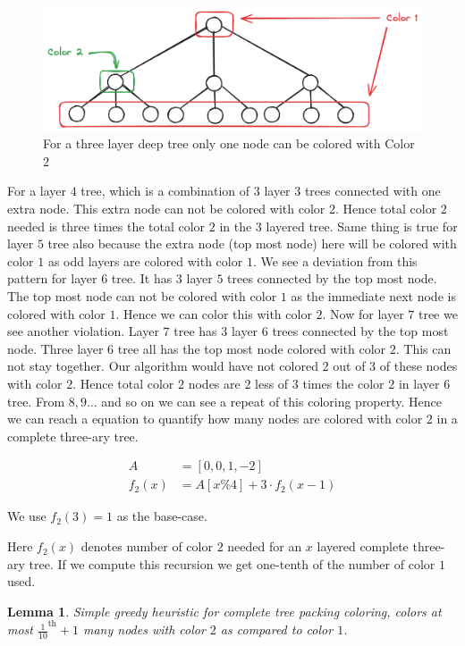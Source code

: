\documentclass{article}
\newtheorem{lemma}[theorem]{Lemma}
\theoremstyle{remark}
\begin{document}
\begin{figure}
    \centering
    \includegraphics[width=0.7\linewidth]{layer 3.png}
    \caption{For a three layer deep tree only one node can be colored with Color $2$}
    \label{fig:enter-label}
\end{figure}

For a layer $4$ tree, which is a combination of $3$ layer $3$ trees connected with one extra node. This extra node can not be colored with color $2$. Hence total color $2$ needed is three times the total color $2$ in the $3$ layered tree. Same thing is true for layer $5$ tree also because the extra node (top most node) here will be colored with color $1$ as odd layers are colored with color $1$. We see a deviation from this pattern for layer $6$ tree. It has $3$ layer $5$ trees connected by the top most node. The top most node can not be colored with color $1$ as the immediate next node is colored with color $1$. Hence we can color this with color $2$. Now for layer $7$ tree we see another violation. Layer $7$ tree has 3 layer 6 trees connected by the top most node. Three layer $6$ tree all has the top most node colored with color $2$. This can not stay together. Our algorithm would have not colored 2 out of 3 of these nodes with color $2$. Hence total color $2$ nodes are $2$ less of 3 times the color $2$ in layer $6$ tree. From $8, 9 \dots$ and so on we can see a repeat of this coloring property. Hence we can reach a equation to quantify how many nodes are colored with color $2$ in a complete three-ary tree.

\begin{align*}
    A &= [0, 0, 1, -2]\\
    f_2(x) &= A[x \% 4] + 3 \cdot f_2(x - 1)
\end{align*}

We use $f_2(3) = 1$ as the base-case. 

Here $f_2(x)$ denotes number of color $2$ needed for an $x$ layered complete three-ary tree. If we compute this recursion we get one-tenth of the number of color $1$ used.

\begin{lemma}
    Simple greedy heuristic for complete tree packing coloring, colors at most $\frac{1}{10} ^{\text{th}} + 1$ many nodes with color $2$ as compared to color $1$.
\end{lemma}
\end{document}
